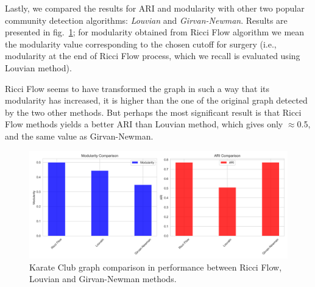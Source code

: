 Lastly, we compared the results for ARI and modularity with other two popular community detection algorithms: \textit{Louvian} and \textit{Girvan-Newman}. Results are presented in fig.~\ref{fig:Karate_Comparison}; for modularity obtained from Ricci Flow algorithm we mean the modularity value corresponding to the chosen cutoff for surgery (i.e., modularity at the end of Ricci Flow process, which we recall is evaluated using Louvian method). 

Ricci Flow seems to have transformed the graph in such a way that its modularity has increased, it is higher than the one of the original graph detected by the two other methods. But perhaps the most significant result is that Ricci Flow methods yields a better ARI than Louvian method, which gives only $\approx$0.5, and the same value as Girvan-Newman.
\begin{figure}
    \centering
    \includegraphics[width=\textwidth]{../KarateClubResults/Comparison.png}
    \caption{Karate Club graph comparison in performance between Ricci Flow, Louvian and Girvan-Newman methods.}
    \label{fig:Karate_Comparison}
\end{figure}